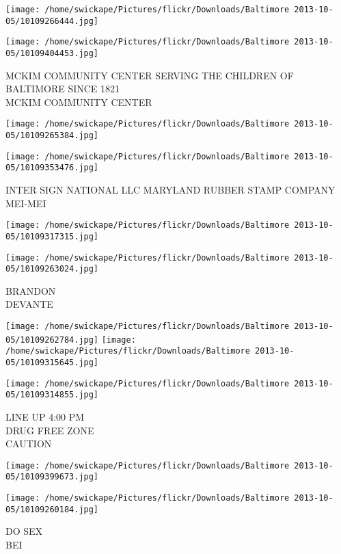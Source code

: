 \documentclass[10pt,letterpaper]{article}
\begin{document}
\texttt{[image: /home/swickape/Pictures/flickr/Downloads/Baltimore 2013-10-05/10109266444.jpg]}

\vspace{0.25in}
\texttt{[image: /home/swickape/Pictures/flickr/Downloads/Baltimore 2013-10-05/10109404453.jpg]}

MCKIM COMMUNITY CENTER SERVING THE CHILDREN OF BALTIMORE SINCE 1821\\
MCKIM COMMUNITY CENTER
\pagebreak

\texttt{[image: /home/swickape/Pictures/flickr/Downloads/Baltimore 2013-10-05/10109265384.jpg]}

\vspace{0.25in}
\texttt{[image: /home/swickape/Pictures/flickr/Downloads/Baltimore 2013-10-05/10109353476.jpg]}

INTER SIGN NATIONAL LLC MARYLAND RUBBER STAMP COMPANY\\
MEI{-}MEI
\pagebreak

\texttt{[image: /home/swickape/Pictures/flickr/Downloads/Baltimore 2013-10-05/10109317315.jpg]}

\vspace{0.25in}
\texttt{[image: /home/swickape/Pictures/flickr/Downloads/Baltimore 2013-10-05/10109263024.jpg]}

BRANDON\\
DEVANTE
\pagebreak

\texttt{[image: /home/swickape/Pictures/flickr/Downloads/Baltimore 2013-10-05/10109262784.jpg]}
\texttt{[image: /home/swickape/Pictures/flickr/Downloads/Baltimore 2013-10-05/10109315645.jpg]}

\texttt{[image: /home/swickape/Pictures/flickr/Downloads/Baltimore 2013-10-05/10109314855.jpg]}

LINE UP 4:00 PM\\
DRUG FREE ZONE\\
CAUTION
\pagebreak

\texttt{[image: /home/swickape/Pictures/flickr/Downloads/Baltimore 2013-10-05/10109399673.jpg]}

\vspace{0.25in}
\texttt{[image: /home/swickape/Pictures/flickr/Downloads/Baltimore 2013-10-05/10109260184.jpg]}

DO SEX\\
BEI
\pagebreak
\end{document}
